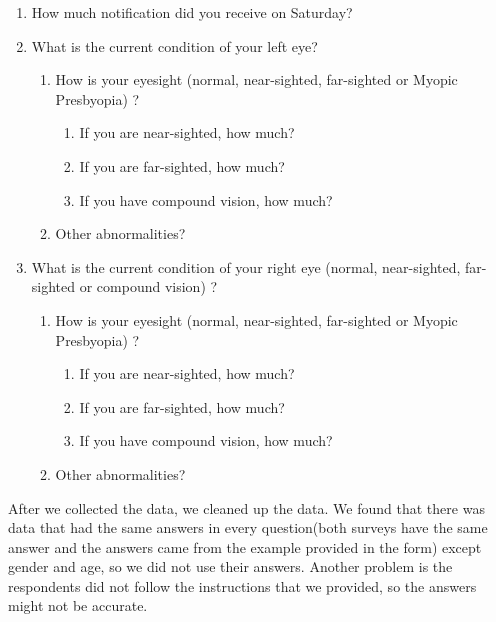 \begin{multicols}{2}
\begin{enumerate}
        \item How much notification did you receive on Saturday?
        \item What is the current condition of your left eye?
        \begin{enumerate}[label=21.\arabic*]
            \item How is your eyesight (normal, near-sighted, far-sighted or Myopic Presbyopia) ?
            \begin{enumerate}[label=21.1.\arabic*]
                \item If you are near-sighted, how much?
                \item If you are far-sighted, how much?
                \item If you have compound vision, how much?
            \end{enumerate}
            \item Other abnormalities?
        \end{enumerate}
        \item What is the current condition of your right eye (normal, near-sighted, far-sighted or compound vision) ?
        \begin{enumerate}[label=22.\arabic*]
            \item How is your eyesight (normal, near-sighted, far-sighted or Myopic Presbyopia) ?
            \begin{enumerate}[label=22.1.\arabic*]
                \item If you are near-sighted, how much?
                \item If you are far-sighted, how much?
                \item If you have compound vision, how much?
            \end{enumerate}
            \item Other abnormalities?
        \end{enumerate}
    \end{enumerate}
\end{multicols}
\newpage
After we collected the data, we cleaned up the data. We found that there was data that had the same answers in every question(both surveys have the same answer and the answers came from the example provided in the form) except gender and age, so we did not use their answers. Another problem is the respondents did not follow the instructions that we provided, so the answers might not be accurate.\\ \par
